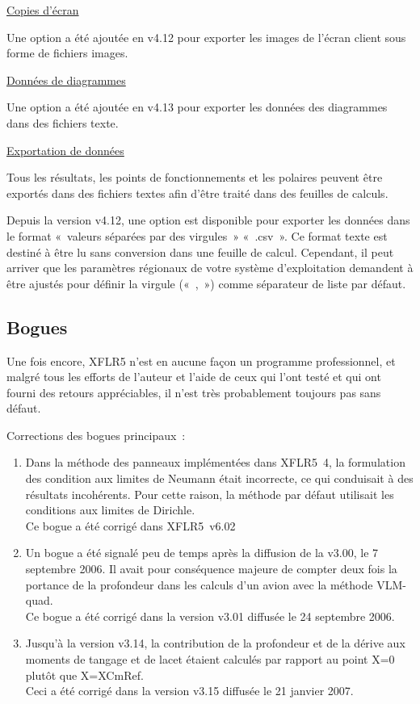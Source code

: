 \documentclass[a4paper,twoside,12pt,dvips]{article}
\begin{document}
\underline{Copies d’écran}

Une option a été ajoutée en v4.12 pour exporter les images de l’écran 
client sous forme de fichiers images.

\underline{Données de diagrammes}

Une option a été ajoutée en v4.13 pour exporter les données des diagrammes
dans des fichiers texte.

\underline{Exportation de données}

Tous les résultats, les points de fonctionnements et les polaires peuvent
être exportés dans des fichiers textes afin d’être traité dans des feuilles
de calculs.

Depuis la version v4.12, une option est disponible pour exporter les données
dans le format «~valeurs séparées par des virgules~» «~.csv~». Ce format
texte est destiné à être lu sans conversion dans une feuille de calcul.
Cependant, il peut arriver que les paramètres régionaux de votre système
d’exploitation demandent à être ajustés pour définir la virgule («~,~»)
comme séparateur de liste par défaut. 

\subsection{Bogues}

Une fois encore, XFLR5 n’est en aucune façon un programme professionnel,
et malgré tous les efforts de l’auteur et l’aide de ceux qui l’ont testé et
qui ont fourni des retours appréciables, il n’est très probablement toujours
pas sans défaut.

Corrections des bogues principaux~:
\begin{enumerate}
	\item Dans la méthode des panneaux implémentées dans XFLR5~4, la 
	formulation des condition aux limites de Neumann était incorrecte, ce qui
	conduisait à des résultats incohérents. Pour cette raison, la méthode par
	défaut utilisait les conditions aux limites de Dirichle.\\
	Ce bogue a été corrigé dans XFLR5~v6.02 
	\item Un bogue a été signalé peu de temps après la diffusion de la v3.00,
	le 7 septembre 2006. Il avait pour conséquence majeure de compter deux fois
	la portance de la profondeur dans les calculs d’un avion avec la méthode
	VLM-quad.\\
	Ce bogue a été corrigé dans la version v3.01 diffusée le 24 septembre 2006.
	\item Jusqu’à la version v3.14, la contribution de la profondeur et de la
	dérive aux moments de tangage et de lacet étaient calculés par rapport au
	point X=0 plutôt que X=XCmRef.\\
	Ceci a été corrigé dans la version v3.15 diffusée le 21 janvier 2007.
\end{enumerate}
\end{document}
